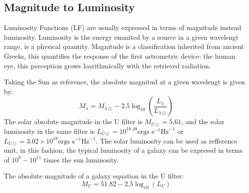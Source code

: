 \subsection{Magnitude to Luminosity}

Luminosity Functions (LF) are usually expressed in terms of magnitude instead 
luminosity. Luminosity is the energy emmited by a source in a given wavelengt range, 
is a physical quantity. 
Magnitude is a classification inherited from ancient Greeks, this
quantifies the response of the first astrometric device: the human eye, this
perception grows loarithmically with the retrieved radiation.

Taking the Sun as reference, the absolute magnitud at a given wavelengt is given by: 
 \[ M_{\lambda} = M_{\lambda \odot} - 2.5 \log_{10}\left( 
\frac{L_\lambda}{L_{\lambda \odot}} \right) \]
  The solar absolute magnitude in the U filter is $M_{U\odot} = 5.61$,
and the solar luminosity in the same filter is $L_{U\odot} = 10^{18.48} 
\textrm{ergs s}^{-1}\textrm{Hz}^{-1}$ or $ L_{U\odot} = 3.02 \times 10^{18} 
\textrm{ergs s}^{-1}\textrm{Hz}^{-1}$. The solar luminosity can be used as
refference unit, in this fashion, the typical luminosity of a galaxy can be expresed in
terms of $10^{8}-10^{11}$ times the sun luminosity.

  The absolute magnitude of a galaxy equation in the U filter:
  \[ M_{U} = 51.82 - 2.5 \log_{10}(L_{U}) \]

